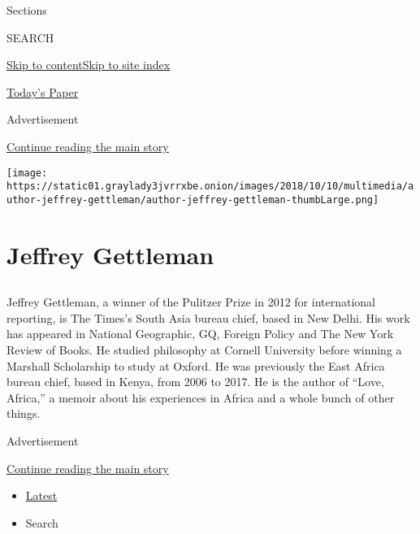 Sections

SEARCH

\protect\hyperlink{site-content}{Skip to
content}\protect\hyperlink{site-index}{Skip to site index}

\href{https://myaccount.nytimes3xbfgragh.onion/auth/login?response_type=cookie\&client_id=vi}{}

\href{https://www.nytimes3xbfgragh.onion/section/todayspaper}{Today's
Paper}

Advertisement

\protect\hyperlink{after-top}{Continue reading the main story}

\texttt{[image: https://static01.graylady3jvrrxbe.onion/images/2018/10/10/multimedia/author-jeffrey-gettleman/author-jeffrey-gettleman-thumbLarge.png]}

\hypertarget{jeffrey-gettleman}{%
\section{Jeffrey Gettleman}\label{jeffrey-gettleman}}

\subsection{}

Jeffrey Gettleman, a winner of the Pulitzer Prize in 2012 for
international reporting, is The Times's South Asia bureau chief, based
in New Delhi. His work has appeared in National Geographic, GQ, Foreign
Policy and The New York Review of Books. He studied philosophy at
Cornell University before winning a Marshall Scholarship to study at
Oxford. He was previously the East Africa bureau chief, based in Kenya,
from 2006 to 2017. He is the author of ``Love, Africa,'' a memoir about
his experiences in Africa and a whole bunch of other things.

Advertisement

\protect\hyperlink{after-mid1}{Continue reading the main story}

\begin{itemize}
\tightlist
\item
  \protect\hyperlink{stream-panel}{Latest}
\item
  Search
\end{itemize}

